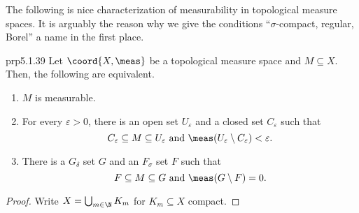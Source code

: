 The following is nice characterization of measurability in topological measure spaces.  It is arguably the reason why we give the conditions ``$\sigma$-compact, regular, Borel'' a name in the first place.
\begin{prp}{}{prp5.1.39}
Let $\coord{X,\meas}$ be a topological measure space and $M\subseteq X$.  Then, the following are equivalent.
\begin{enumerate}
\item \label{prp5.1.39.i}$M$ is measurable.
\item \label{prp5.1.39.ii}For every $\varepsilon >0$, there is an open set $U_{\varepsilon}$ and a closed set $C_{\varepsilon}$ such that
\begin{equation}
C_{\varepsilon}\subseteq M\subseteq U_{\varepsilon}\text{ and }\meas (U_{\varepsilon}\setminus C_{\varepsilon})<\varepsilon .
\end{equation}
\item \label{prp5.1.39.iii}There is a $G_{\delta}$ set $G$ and an $F_{\sigma}$ set $F$ such that
\begin{equation}
F\subseteq M\subseteq G\text{ and }\meas (G\setminus F)=0.
\end{equation}
\end{enumerate}
\begin{proof}
Write $X=\bigcup _{m\in \N}K_m$ for $K_m\subseteq X$ compact.


\end{proof}
\end{prp}
